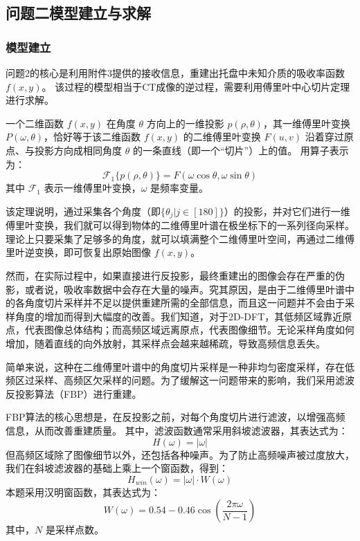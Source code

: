 \subsection{问题二模型建立与求解}
\subsubsection{模型建立}
问题2的核心是利用附件3提供的接收信息，重建出托盘中未知介质的吸收率函数$f(x,y)$。
该过程的模型相当于CT成像的逆过程，需要利用傅里叶中心切片定理进行求解。\par
\begin{theorem}[傅里叶中心切片定理]
    一个二维函数 $f(x,y)$ 在角度 $\theta$ 方向上的一维投影 $p(\rho,\theta)$，其一维傅里叶变换$P(\omega,\theta)$，恰好等于该二维函数 $f(x,y)$ 的二维傅里叶变换 $F(u,v)$ 沿着穿过原点、与投影方向成相同角度 $\theta$ 的一条直线（即一个“切片”）上的值。
    用算子表示为：
    $$\mathcal{F}_1\{p(\rho,\theta)\}=F(\omega\cos\theta,\omega\sin\theta)$$
    其中 $\mathcal{F}_1$ 表示一维傅里叶变换，$\omega$ 是频率变量。\par
\end{theorem}
该定理说明，通过采集各个角度（即$\{\theta_j|j\in [180] \}$）的投影，并对它们进行一维傅里叶变换，我们就可以得到物体的二维傅里叶谱在极坐标下的一系列径向采样。理论上只要采集了足够多的角度，就可以填满整个二维傅里叶空间，再通过二维傅里叶逆变换，即可恢复出原始图像 $f(x,y)$。\par

然而，在实际过程中，如果直接进行反投影，最终重建出的图像会存在严重的伪影，或者说，吸收率数据中会存在大量的噪声。究其原因，是由于二维傅里叶谱中的各角度切片采样并不足以提供重建所需的全部信息，而且这一问题并不会由于采样角度的增加而得到大幅度的改善。我们知道，对于2D-DFT，其低频区域靠近原点，代表图像总体结构；而高频区域远离原点，代表图像细节。无论采样角度如何增加，随着直线的向外放射，其采样点会越来越稀疏，导致高频信息丢失。\par
简单来说，这种在二维傅里叶谱中的角度切片采样是一种非均匀密度采样，存在低频区过采样、高频区欠采样的问题。为了缓解这一问题带来的影响，我们采用滤波反投影算法（FBP）进行重建。\par
FBP算法的核心思想是，在反投影之前，对每个角度切片进行滤波，以增强高频信息，从而改善重建质量。
其中，滤波函数通常采用斜坡滤波器，其表达式为：
$$H(\omega)=|\omega|$$
但高频区域除了图像细节以外，还包括各种噪声。为了防止高频噪声被过度放大，我们在斜坡滤波器的基础上乘上一个窗函数，得到：
$$H_{win}(\omega)=|\omega|\cdot W(\omega)$$
本题采用汉明窗函数，其表达式为：
$$W(\omega) = 0.54 - 0.46 \cos(\frac{2\pi \omega}{N-1})$$
其中，$N$ 是采样点数。\par

